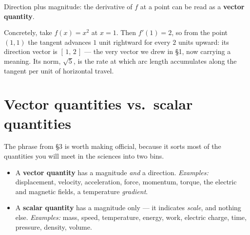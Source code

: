 \documentclass[11pt]{article}
\theoremstyle{definition}
\theoremstyle{remark}
\begin{document}
\noindent Direction plus magnitude: the derivative of $f$ at a point can be read
as a \textbf{vector quantity}.

Concretely, take $f(x)=x^{2}$ at $x=1$. Then $f'(1)=2$, so from the point
$(1,1)$ the tangent advances $1$ unit rightward for every $2$ units upward: its
direction vector is $[\,1,\,2\,]$ --- the very vector we drew in \S1, now
carrying a meaning. Its norm, $\sqrt{5}$, is the rate at which arc length
accumulates along the tangent per unit of horizontal travel.

\begin{center}
\end{center}

\section{Vector quantities vs.\ scalar quantities}
The phrase from \S3 is worth making official, because it sorts most of the
quantities you will meet in the sciences into two bins.

\begin{itemize}[leftmargin=1.4em,itemsep=3pt]
  \item A \textbf{vector quantity} has a magnitude \emph{and} a direction.
        \emph{Examples:} displacement, velocity, acceleration, force, momentum,
        torque, the electric and magnetic fields, a temperature \emph{gradient}.
  \item A \textbf{scalar quantity} has a magnitude only --- it indicates
        \emph{scale}, and nothing else. \emph{Examples:} mass, speed,
        temperature, energy, work, electric charge, time, pressure, density,
        volume.
\end{itemize}
\end{document}

